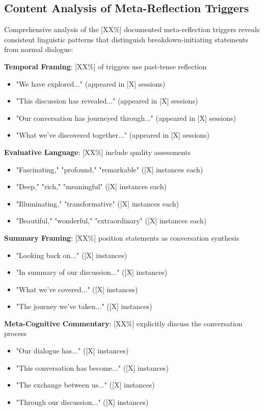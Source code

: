 \documentclass[11pt,letterpaper]{article}
\newcommand{\metaReflectionTriggers}{[XX\%]} %
\begin{document}
\subsection{Content Analysis of Meta-Reflection Triggers}

Comprehensive analysis of the \metaReflectionTriggers{} documented meta-reflection triggers reveals consistent linguistic patterns that distinguish breakdown-initiating statements from normal dialogue:

\textbf{Temporal Framing}: [XX\%] of triggers use past-tense reflection
\begin{itemize}
    \item "We have explored..." (appeared in [X] sessions)
    \item "This discussion has revealed..." (appeared in [X] sessions)  
    \item "Our conversation has journeyed through..." (appeared in [X] sessions)
    \item "What we've discovered together..." (appeared in [X] sessions)
\end{itemize}

\textbf{Evaluative Language}: [XX\%] include quality assessments
\begin{itemize}
    \item "Fascinating," "profound," "remarkable" ([X] instances each)
    \item "Deep," "rich," "meaningful" ([X] instances each)
    \item "Illuminating," "transformative" ([X] instances each)
    \item "Beautiful," "wonderful," "extraordinary" ([X] instances each)
\end{itemize}

\textbf{Summary Framing}: [XX\%] position statements as conversation synthesis
\begin{itemize}
    \item "Looking back on..." ([X] instances)
    \item "In summary of our discussion..." ([X] instances)
    \item "What we've covered..." ([X] instances)
    \item "The journey we've taken..." ([X] instances)
\end{itemize}

\textbf{Meta-Cognitive Commentary}: [XX\%] explicitly discuss the conversation process
\begin{itemize}
    \item "Our dialogue has..." ([X] instances)
    \item "This conversation has become..." ([X] instances)
    \item "The exchange between us..." ([X] instances)
    \item "Through our discussion..." ([X] instances)
\end{itemize}
\end{document}
